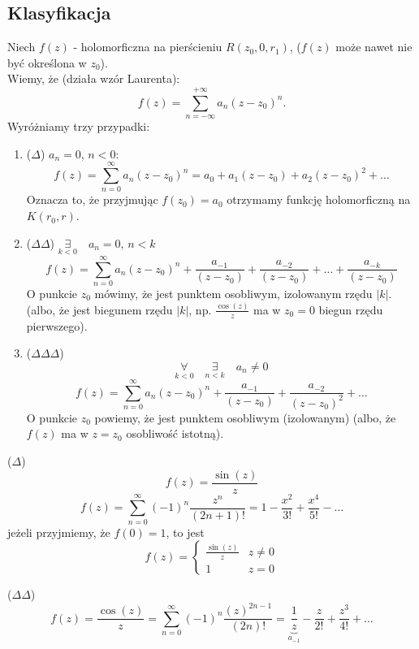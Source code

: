 \documentclass[../main.tex]{subfiles}
\begin{document}
\subsection{Klasyfikacja}
    Niech $f(z)$ - holomorficzna na pierścieniu $R(z_0, 0, r_1)$, ($f(z)$ może nawet nie być określona w $z_0$).\\
    Wiemy, że (działa wzór Laurenta):
    \[
        f(z) = \sum\limits_{n = -\infty}^{+\infty}a_n(z-z_0)^n
    .\]
Wyróżniamy trzy przypadki:
    \begin{enumerate}
        \item ($\Delta$) $a_n = 0$, $n < 0$:
            \[
                f(z) = \sum_{n = 0}^\infty a_n(z-z_0)^n = a_0 + a_1(z-z_0) + a_2(z-z_0)^2 + \dots
            \]
            Oznacza to, że przyjmując $f(z_0) = a_0$ otrzymamy funkcję holomorficzną na $K(r_0, r)$.
        \item ($\Delta\Delta$) $\underset{k<0}{\exists}\quad a_n = 0$, $n < k$
            \[
                f(z) = \sum_{n = 0}^\infty a_n(z-z_0)^n + \frac{a_{-1}}{(z-z_0)} + \frac{a_{-2}}{(z-z_0)} + \dots + \frac{a_{-k}}{(z-z_0)}
            \]
            O punkcie $z_0$ mówimy, że jest punktem osobliwym, izolowanym rzędu $|k|$. (albo, że jest biegunem rzędu $|k|$, np. $\frac{\cos(z)}{z}$ ma w $z_0 = 0$ biegun rzędu pierwszego).
        \item ($\Delta\Delta\Delta$)
            \[
                \underset{k < 0}{\forall}\quad \underset{n < k}{\exists}\quad a_n \neq 0
            \]
            \[
                f(z) = \sum_{n = 0}^\infty a_n(z-z_0)^n + \frac{a_{-1}}{(z-z_0)} + \frac{a_{-2}}{(z-z_0)^2} + \dots
            \]
            O punkcie $z_0$ powiemy, że jest punktem osobliwym (izolowanym) (albo, że $f(z)$ ma w $z = z_0$ osobliwość istotną).
    \end{enumerate}
\begin{przyklad}($\Delta$)\\
    \[
        f(z) = \frac{\sin(z)}{z}
    \]
    \[
        f(z) = \sum_{n = 0}^\infty (-1)^n \frac{z^n}{(2n+1)!} = 1 - \frac{x^2}{3!} + \frac{x^4}{5!} - \dots
    \]
    jeżeli przyjmiemy, że $f(0) = 1$, to jest
    \[
        f(z) = \begin{cases}\frac{\sin(z)}{z} & z \neq 0\\ 1 & z = 0\end{cases}
    \]
\end{przyklad}
\begin{przyklad}
    ($\Delta\Delta$)\\
    \[
        f(z) = \frac{\cos(z)}{z} = \sum_{n = 0}^\infty (-1)^n \frac{(z)^{2n - 1}}{(2n)!} = \underbrace{\frac{1}{z}}_{a_{-1}} - \frac{z}{2!} + \frac{z^3}{4!} + \dots
    \]
\end{przyklad}
\end{document}
